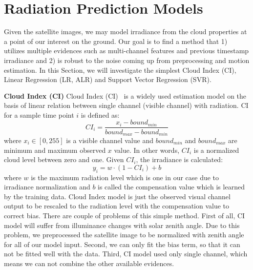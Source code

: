 \documentclass[conference]{IEEEtran}
\begin{document}
\section{Radiation Prediction Models}
\label{sec:Models}

Given the satellite images, we may model irradiance from the cloud properties at a point of our interest on the ground.
Our goal is to find a method that 1) utilizes multiple evidences such as multi-channel features and previous timestamp irradiance
and 2) is robust to the noise coming up from preprocessing and motion estimation.
In this Section, we will investigate the simplest Cloud Index (CI), Linear
Regression (LR, ALR) and  Support Vector Regression (SVR).

\textbf{Cloud Index (CI)} 
Cloud Index (CI)~\cite{perez2002new} is a widely used estimation model on the
basis of linear relation between single channel (visible channel) with radiation. CI for a sample time point $i$ is defined as:
%
\begin{equation}
CI_i=\frac{x_i-bound_{min} }{bound_{max}-bound_{min}}
\end{equation}
%
where $x_i\in[0,255]$ is a visible channel value and $bound_{min}$ and
$bound_{max}$ are minimum and maximum observed $x$ value. In other words, $CI_i$ is a normalized
cloud level between zero and one. Given $CI_i$, the irradiance is calculated:
\begin{equation}
y_i=w \cdot (1 - CI_i)+b
\end{equation}
where $w$ is the maximum radiation level which is one in our case due to irradiance normalization 
and $b$ is called the compensation value which is learned by the training data.
%
Cloud Index model is just the observed visual channel output to be rescaled to the radiation level
with the compensation value to correct bias.
There are couple of problems of this simple method. First of all, CI model will suffer from illuminance changes with solar zenith angle.
Due to this problem, we preprocessed the satellite image to be normalized with zenith angle for all of our model input.
Second, we can only fit the bias term, so that it can not be fitted well with the data.
Third, CI model used only single channel, which means we can not combine the other available evidences.
\end{document}
